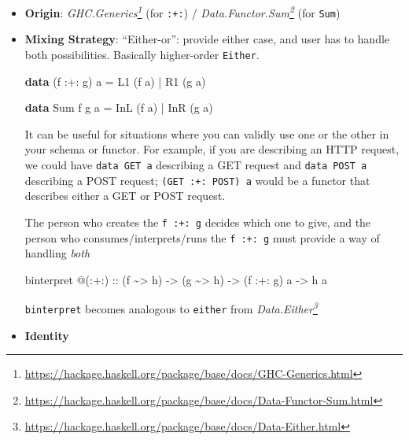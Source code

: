\documentclass[]{article}
\newenvironment{Shaded}{}{}
\newcommand{\DataTypeTok}[1]{\textcolor[rgb]{0.56,0.13,0.00}{#1}}
\newcommand{\KeywordTok}[1]{\textcolor[rgb]{0.00,0.44,0.13}{\textbf{#1}}}
\newcommand{\NormalTok}[1]{#1}
\newcommand{\OperatorTok}[1]{\textcolor[rgb]{0.40,0.40,0.40}{#1}}
\newcommand{\OtherTok}[1]{\textcolor[rgb]{0.00,0.44,0.13}{#1}}
\renewcommand{\href}[2]{#2\footnote{\url{#1}}}
\begin{document}
\begin{itemize}
\item
  \textbf{Origin}:
  \emph{\href{https://hackage.haskell.org/package/base/docs/GHC-Generics.html}{GHC.Generics}}
  (for \texttt{:+:}) /
  \emph{\href{https://hackage.haskell.org/package/base/docs/Data-Functor-Sum.html}{Data.Functor.Sum}}
  (for \texttt{Sum})
\item
  \textbf{Mixing Strategy}: ``Either-or'': provide either case, and user has to
  handle both possibilities. Basically higher-order \texttt{Either}.

\begin{Shaded}
\begin{Highlighting}[]
\KeywordTok{data}\NormalTok{ (f }\OperatorTok{:+:}\NormalTok{ g) a}
    \OtherTok{=} \DataTypeTok{L1}\NormalTok{ (f a)}
    \OperatorTok{|} \DataTypeTok{R1}\NormalTok{ (g a)}

\KeywordTok{data} \DataTypeTok{Sum}\NormalTok{ f g a}
    \OtherTok{=} \DataTypeTok{InL}\NormalTok{ (f a)}
    \OperatorTok{|} \DataTypeTok{InR}\NormalTok{ (g a)}
\end{Highlighting}
\end{Shaded}

  It can be useful for situations where you can validly use one or the other in
  your schema or functor. For example, if you are describing an HTTP request, we
  could have \texttt{data\ GET\ a} describing a GET request and
  \texttt{data\ POST\ a} describing a POST request; \texttt{(GET\ :+:\ POST)\ a}
  would be a functor that describes either a GET or POST request.

  The person who creates the \texttt{f\ :+:\ g} decides which one to give, and
  the person who consumes/interprets/runs the \texttt{f\ :+:\ g} must provide a
  way of handling \emph{both}

\begin{Shaded}
\begin{Highlighting}[]
\NormalTok{binterpret }\OperatorTok{@}\NormalTok{(}\OperatorTok{:+:}\NormalTok{)}
\OtherTok{    ::}\NormalTok{ (f }\OperatorTok{\textasciitilde{}>}\NormalTok{ h)}
    \OtherTok{{-}>}\NormalTok{ (g }\OperatorTok{\textasciitilde{}>}\NormalTok{ h)}
    \OtherTok{{-}>}\NormalTok{ (f }\OperatorTok{:+:}\NormalTok{ g) a}
    \OtherTok{{-}>}\NormalTok{ h a}
\end{Highlighting}
\end{Shaded}

  \texttt{binterpret} becomes analogous to \texttt{either} from
  \emph{\href{https://hackage.haskell.org/package/base/docs/Data-Either.html}{Data.Either}}
\item
  \textbf{Identity}


\end{itemize}
\end{document}
